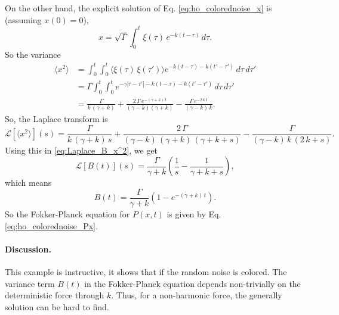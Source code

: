 \documentclass{article}
\begin{document}
On the other hand,
the explicit solution of Eq. \eqref{eq:ho_colorednoise_x} is
(assuming $x(0) = 0$),
$$
x = \sqrt{\Gamma} \int_0^t \xi(\tau) \, e^{-k(t-\tau)}  \, d\tau.
$$
So the variance
$$
\begin{aligned}
\langle x^2 \rangle
&=
\int_0^t\int_0^t \langle \xi(\tau) \, \xi(\tau') \rangle
e^{-k(t-\tau)-k(t'-\tau')} \, d\tau \, d\tau'
\\
&=
\Gamma \int_0^t\int_0^t
e^{-\gamma|\tau - \tau'|-k(t-\tau)-k(t'-\tau')} \, d\tau \, d\tau'
\\
&=
  \frac{\Gamma }{k\,(\gamma + k) }
  +
  \frac{2 \, \Gamma \, e^{-(\gamma + k) \, t} }{(\gamma - k) (\gamma + k) }
  -
  \frac{\Gamma \, e^{-2 \, k \, t} }{(\gamma - k) \, k }.
\end{aligned}
$$
So, the Laplace transform is
$$
\mathcal L[\langle x^2 \rangle](s)
=
  \frac{ \Gamma } { k \, (\gamma + k) \, s }
  +
  \frac{ 2 \, \Gamma } { (\gamma - k) \, (\gamma + k) \, (\gamma + k + s) }
  -
  \frac{ \Gamma } { (\gamma - k ) \, k \, (2 \, k + s) }.
$$
Using this in \eqref{eq:Laplace_B_x^2}, we get
$$
\mathcal L[B(t)](s) =
  \frac{ \Gamma }{ \gamma + k }
  \left( \frac{1}{s} - \frac{1}{ \gamma + k + s } \right),
$$
which means
$$
B(t) = \frac{ \Gamma } { \gamma + k } \left( 1 - e^{-(\gamma + k) \,t} \right).
$$
So the Fokker-Planck equation for $P(x, t)$ is given by
Eq. \eqref{eq:ho_colorednoise_Px}.

\paragraph{Discussion.}

This example is instructive,
it shows that if the random noise is colored.
%
The variance term $B(t)$ in the Fokker-Planck equation
depends non-trivially on the deterministic force through $k$.
%
Thus, for a non-harmonic force, the generally solution
can be hard to find.
\end{document}
